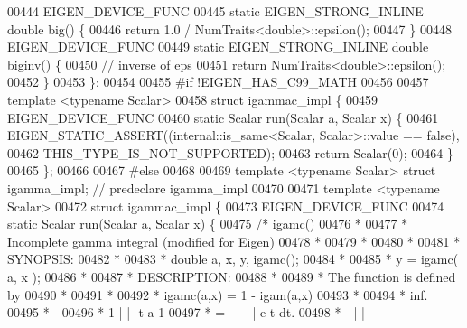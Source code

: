 \begin{DoxyCode}
00444   EIGEN\_DEVICE\_FUNC
00445   \textcolor{keyword}{static} EIGEN\_STRONG\_INLINE \textcolor{keywordtype}{double} big() \{
00446     \textcolor{keywordflow}{return} 1.0 / NumTraits<double>::epsilon();
00447   \}
00448   EIGEN\_DEVICE\_FUNC
00449   \textcolor{keyword}{static} EIGEN\_STRONG\_INLINE \textcolor{keywordtype}{double} biginv() \{
00450     \textcolor{comment}{// inverse of eps}
00451     \textcolor{keywordflow}{return} NumTraits<double>::epsilon();
00452   \}
00453 \};
00454 
00455 \textcolor{preprocessor}{#if !EIGEN\_HAS\_C99\_MATH}
00456 
00457 \textcolor{keyword}{template} <\textcolor{keyword}{typename} Scalar>
00458 \textcolor{keyword}{struct }igammac\_impl \{
00459   EIGEN\_DEVICE\_FUNC
00460   \textcolor{keyword}{static} Scalar run(Scalar a, Scalar x) \{
00461     EIGEN\_STATIC\_ASSERT((internal::is\_same<Scalar, Scalar>::value == \textcolor{keyword}{false}),
00462                         THIS\_TYPE\_IS\_NOT\_SUPPORTED);
00463     \textcolor{keywordflow}{return} Scalar(0);
00464   \}
00465 \};
00466 
00467 \textcolor{preprocessor}{#else}
00468 
00469 \textcolor{keyword}{template} <\textcolor{keyword}{typename} Scalar> \textcolor{keyword}{struct }igamma\_impl;  \textcolor{comment}{// predeclare igamma\_impl}
00470 
00471 \textcolor{keyword}{template} <\textcolor{keyword}{typename} Scalar>
00472 \textcolor{keyword}{struct }igammac\_impl \{
00473   EIGEN\_DEVICE\_FUNC
00474   \textcolor{keyword}{static} Scalar run(Scalar a, Scalar x) \{
00475     \textcolor{comment}{/*  igamc()}
00476 \textcolor{comment}{     *}
00477 \textcolor{comment}{     *  Incomplete gamma integral (modified for Eigen)}
00478 \textcolor{comment}{     *}
00479 \textcolor{comment}{     *}
00480 \textcolor{comment}{     *}
00481 \textcolor{comment}{     * SYNOPSIS:}
00482 \textcolor{comment}{     *}
00483 \textcolor{comment}{     * double a, x, y, igamc();}
00484 \textcolor{comment}{     *}
00485 \textcolor{comment}{     * y = igamc( a, x );}
00486 \textcolor{comment}{     *}
00487 \textcolor{comment}{     * DESCRIPTION:}
00488 \textcolor{comment}{     *}
00489 \textcolor{comment}{     * The function is defined by}
00490 \textcolor{comment}{     *}
00491 \textcolor{comment}{     *}
00492 \textcolor{comment}{     *  igamc(a,x)   =   1 - igam(a,x)}
00493 \textcolor{comment}{     *}
00494 \textcolor{comment}{     *                            inf.}
00495 \textcolor{comment}{     *                              -}
00496 \textcolor{comment}{     *                     1       | |  -t  a-1}
00497 \textcolor{comment}{     *               =   -----     |   e   t   dt.}
00498 \textcolor{comment}{     *                    -      | |}

\end{DoxyCode}
